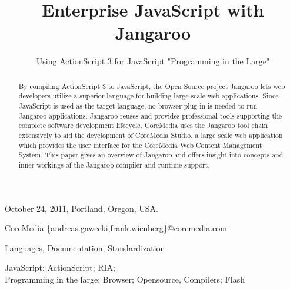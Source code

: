 \documentclass[11pt]{sigplanconf}
\begin{document}
 
 {October 24, 2011, Portland, Oregon, USA.}

\copyrightdata{} 



\title{Enterprise JavaScript with Jangaroo}
\subtitle{Using ActionScript 3 for JavaScript "Programming in the Large"}

           {CoreMedia}
           {\{andreas.gawecki,frank.wienberg\}@coremedia.com}

\maketitle

\begin{abstract}
By compiling ActionScript 3 to JavaScript, the Open Source project Jangaroo lets web developers utilize a superior language for building large scale web applications. Since JavaScript is used as the target language, no browser plug-in is needed to run Jangaroo applications. Jangaroo reuses and provides professional tools supporting the complete software development lifecycle. CoreMedia uses the Jangaroo tool chain extensively to aid the development of CoreMedia Studio, a large scale web application which provides the user interface for the CoreMedia Web Content Management System. This paper gives an overview of Jangaroo and offers insight into concepts and inner workings of the Jangaroo compiler and runtime support.
\end{abstract}


\terms
Languages, Documentation, Standardization 

\keywords
JavaScript; ActionScript;
RIA; \\
Programming in the large; 
Browser; Opensource, Compilers; 
Flash
\end{document}
